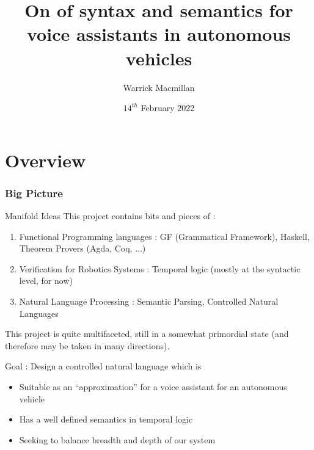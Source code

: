 \documentclass{beamer}
\title{On of syntax and semantics for voice assistants in autonomous vehicles }
\author{Warrick Macmillan}
\date{$14^{th}$ February 2022}
\begin{document}
\begin{frame}
  \titlepage
\end{frame}

\section{Overview}



\begin{frame}
\frametitle{Big Picture}

\begin{exampleblock}{Manifold Ideas}
This project contains bits and pieces of :
\end{exampleblock}

\begin{enumerate}
\item Functional Programming languages : GF (Grammatical Framework), Haskell, Theorem Provers (Agda, Coq, ...)
\item Verification for Robotics Systems :  Temporal logic (mostly at the syntactic level, for now)
\item Natural Language Processing : Semantic Parsing, Controlled Natural Languages
\end{enumerate}
\end{frame}

\begin{frame}



\end{frame}

\begin{frame}



\end{frame}



\begin{frame}

\begin{exampleblock}{}
This project is quite multifaceted, still in a somewhat primordial state (and therefore may be taken in many directions).
\end{exampleblock}

\begin{block}{}
Goal : Design a controlled natural language which is 
\end{block}

\begin{itemize}
\item Suitable as an ``approximation'' for a voice assistant for an autonomous vehicle
\item Has a well defined semantics in temporal logic
\item Seeking to balance breadth and depth of our system
\end{itemize}

\end{frame}
\end{document}
